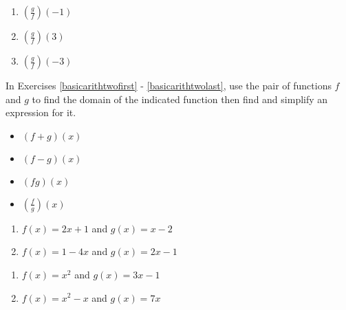 \documentclass{ximera}
\begin{document}
\begin{enumerate}
\setcounter{enumi}{\value{HW}}

\item $\left(\frac{g}{f}\right)(-1)$
\item $\left(\frac{g}{f}\right)(3)$
\item $\left(\frac{g}{f}\right)(-3)$ \label{reformarithlast}

\setcounter{HW}{\value{enumi}}
\end{enumerate}

In Exercises \ref{basicarithtwofirst} - \ref{basicarithtwolast}, use the pair of functions $f$ and $g$ to find the domain of the indicated function then find and simplify an expression for it.

\begin{itemize}

\item  $(f+g)(x)$
\item  $(f-g)(x)$
\item  $(fg)(x)$
\item  $\left(\frac{f}{g}\right)(x)$

\end{itemize}

\begin{enumerate}
\setcounter{enumi}{\value{HW}}

\item $f(x) = 2x+1$ and $g(x) = x-2$ \label{basicarithtwofirst}
\item $f(x) = 1-4x$ and $g(x) = 2x-1$

\setcounter{HW}{\value{enumi}}
\end{enumerate}

\begin{enumerate}
\setcounter{enumi}{\value{HW}}

\item $f(x) = x^2$ and $g(x) = 3x-1$
\item $f(x) = x^2-x$ and $g(x) = 7x$

\setcounter{HW}{\value{enumi}}
\end{enumerate}
\end{document}
